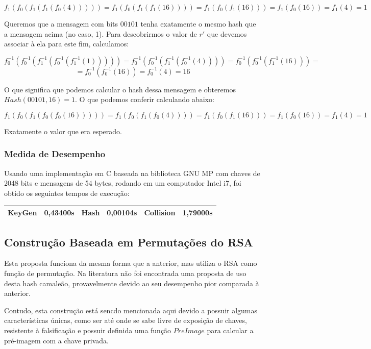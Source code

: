 \documentclass[a4paper]{article}
\begin{document}
$$
f_1(f_0(f_1(f_1(f_0(4))))) = f_1(f_0(f_1(f_1(16)))) = f_1(f_0(f_1(16))) =
f_1(f_0(16)) = f_1(4) = 1
$$

Queremos que a mensagem com bits $00101$ tenha exatamente o mesmo hash
que a mensagem acima (no caso, 1). Para descobrirmos o valor de $r'$
que devemos associar à ela para este fim, calculamos:

$$
f_0^{-1}(f_0^{-1}(f_1^{-1}(f_0^{-1}(f_1^{-1}(1))))) =
f_0^{-1}(f_0^{-1}(f_1^{-1}(f_0^{-1}(4)))) =
f_0^{-1}(f_0^{-1}(f_1^{-1}(16))) =
$$
$$
=f_0^{-1}(f_0^{-1}(16)) = f_0^{-1}(4) = 16
$$

O que significa que podemos calcular o hash dessa mensagem e obteremos
$Hash(00101, 16)=1$. O que podemos conferir calculando abaixo:

$$
f_1(f_0(f_1(f_0(f_0(16))))) = f_1(f_0(f_1(f_0(4)))) = f_1(f_0(f_1(16))) =
f_1(f_0(16)) = f_1(4) = 1
$$

Exatamente o valor que era esperado.

\subsubsection{Medida de Desempenho}

Usando uma implementação em C baseada na biblioteca GNU MP com chaves
de 2048 bits e mensagens de 54 bytes, rodando em um computador Intel
i7, foi obtido os seguintes tempos de execução:

\begin{center}
\begin{tabular}{|c|c|c|c|c|c|}
  \hline
  KeyGen & 0,43400s & Hash & 0,00104s & Collision & 1,79000s\\
  \hline
\end{tabular}
\end{center}


\subsection{Construção Baseada em Permutações do RSA}

Esta proposta funciona da mesma forma que a anterior, mas utiliza o
RSA como função de permutação. Na literatura não foi encontrada uma
proposta de uso desta hash camaleão, provavelmente devido ao seu
desempenho pior comparada à anterior. 

Contudo, esta construção está sencdo mencionada aqui devido a possuir
algumas características únicas, como ser até onde se sabe livre de
exposição de chaves, resistente à falsificação e possuir definida uma
função $PreImage$ para calcular a pré-imagem com a chave privada.
\end{document}
